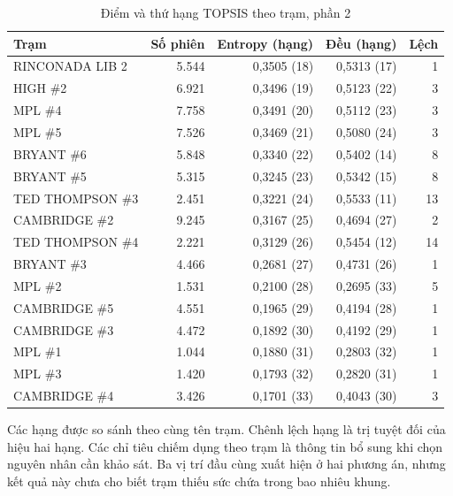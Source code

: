 \documentclass[conference,a4paper]{IEEEtran}
\begin{document}
\begin{table}[!t]
\caption{Điểm và thứ hạng TOPSIS theo trạm, phần 2}
\label{tab:all_stations_1}
\centering\footnotesize
\setlength{\tabcolsep}{3pt}
\begin{tabularx}{\textwidth}{@{}Xrrrr@{}}
\toprule
\textbf{Trạm} & \textbf{Số phiên} & \textbf{Entropy (hạng)} & \textbf{Đều (hạng)} & \textbf{Lệch} \\
\midrule
RINCONADA LIB 2 & 5.544 & 0,3505 (18) & 0,5313 (17) & 1 \\
HIGH \#2 & 6.921 & 0,3496 (19) & 0,5123 (22) & 3 \\
MPL \#4 & 7.758 & 0,3491 (20) & 0,5112 (23) & 3 \\
MPL \#5 & 7.526 & 0,3469 (21) & 0,5080 (24) & 3 \\
BRYANT \#6 & 5.848 & 0,3340 (22) & 0,5402 (14) & 8 \\
BRYANT \#5 & 5.315 & 0,3245 (23) & 0,5342 (15) & 8 \\
TED THOMPSON \#3 & 2.451 & 0,3221 (24) & 0,5533 (11) & 13 \\
CAMBRIDGE \#2 & 9.245 & 0,3167 (25) & 0,4694 (27) & 2 \\
TED THOMPSON \#4 & 2.221 & 0,3129 (26) & 0,5454 (12) & 14 \\
BRYANT \#3 & 4.466 & 0,2681 (27) & 0,4731 (26) & 1 \\
MPL \#2 & 1.531 & 0,2100 (28) & 0,2695 (33) & 5 \\
CAMBRIDGE \#5 & 4.551 & 0,1965 (29) & 0,4194 (28) & 1 \\
CAMBRIDGE \#3 & 4.472 & 0,1892 (30) & 0,4192 (29) & 1 \\
MPL \#1 & 1.044 & 0,1880 (31) & 0,2803 (32) & 1 \\
MPL \#3 & 1.420 & 0,1793 (32) & 0,2820 (31) & 1 \\
CAMBRIDGE \#4 & 3.426 & 0,1701 (33) & 0,4043 (30) & 3 \\
\bottomrule
\end{tabularx}
\end{table}

Các hạng được so sánh theo cùng tên trạm. Chênh lệch hạng là trị tuyệt đối của hiệu hai hạng. Các chỉ tiêu chiếm dụng theo trạm là thông tin bổ sung khi chọn nguyên nhân cần khảo sát. Ba vị trí đầu cùng xuất hiện ở hai phương án, nhưng kết quả này chưa cho biết trạm thiếu sức chứa trong bao nhiêu khung.
\end{document}
